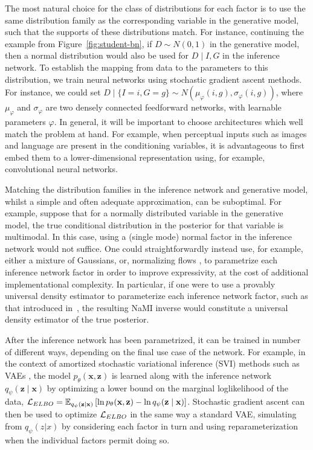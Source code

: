 The most natural choice for the class of distributions for each factor is to use
the same distribution family as the corresponding variable in the generative model, such that the supports of these distributions match.
For instance, continuing the example from Figure~\ref{fig:student-bn}, if $D\sim N(0,1)$ in the generative model, then
a normal distribution would also be used for
$D\mid I,G$ in the inference network. To establish the mapping from data to the parameters to this distribution,
we train neural networks using stochastic gradient ascent methods.  For instance, we could set
$D\mid\{I=i,G=g\}\sim N(\mu_\varphi(i,g),\sigma_\varphi(i,g))$, where $\mu_\varphi$ and $\sigma_\varphi$ are two densely connected
feedforward networks, with learnable parameters $\varphi$.
In general, it will be important to choose architectures which well match the problem at hand.
For example, when perceptual inputs such as images and language are present in the conditioning variables, it is
advantageous to first embed them to a lower-dimensional representation using, for example, convolutional neural networks.

Matching the distribution families in the inference network and generative model, whilst a simple and often adequate approximation, can be suboptimal. For example, suppose that for a normally distributed variable in the generative model, the true conditional distribution in the posterior for that variable is multimodal. In this case, using a (single mode) normal factor in the inference network would not suffice. One could straightforwardly instead use, for example, either a mixture of Gaussians, or, normalizing flows \citep{RezendeMohamed2015,KingmaEtAl2016}, to parametrize each inference network factor in order to improve expressivity, at the cost of additional implementational complexity.
In particular, if one were to use a provably universal density estimator to parameterize each
inference network factor, such as that introduced in~\citet{HuangEtAl2018}, the resulting NaMI inverse
would constitute a universal density estimator of the true posterior.

After the inference network has been parametrized, it can be trained in number of different ways, depending on the final use
case of the network.  For example, in the context of amortized stochastic variational inference (SVI) methods such as VAEs
\citep{KingmaWelling2013,RezendeEtAl2014}, the model $p_\theta(\mathbf{x},\mathbf{z})$ is learned along with the inference network $q_\psi(\mathbf{z}\mid\mathbf{x})$ by optimizing a lower bound on the marginal loglikelihood of the data, $\mathcal{L}_{\sc ELBO} = \mathbb{E}_{q_\psi(\mathbf{z}|\mathbf{x})}\left[\ln p_\theta(\mathbf{x},\mathbf{z}) - \ln q_\psi(\mathbf{z}\mid\mathbf{x})\right]$.
Stochastic gradient ascent can then be used to optimize $\mathcal{L}_{\sc ELBO}$ in the same way a standard VAE,
simulating from $q_\psi (z|x)$ by considering each factor in turn and using reparameterization~\citep{KingmaWelling2013}
when the individual factors permit doing so.


